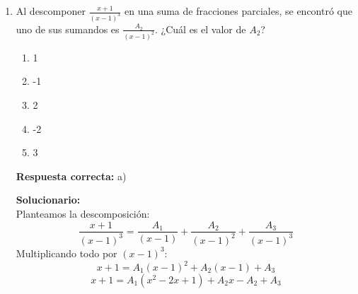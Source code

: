 \begin{enumerate}
	\begin{enumerate}[label=\alph*)]
		\item FVVV
		\item VFVV
		\item VVVF
		\item VVFF
		\item FFVF
	\end{enumerate}
	
	\textbf{Respuesta correcta:} a)
	
	\vspace{2mm}
	\textbf{Solucionario:}\\
	\begin{itemize}
		\item \textbf{I. (F)} Pues $(A + B)^2 = A^2 + AB + BA + B^2$. 
		\item \textbf{II. (V)} La suma de matrices es conmutativa, 
		\item \textbf{III. (V)} Propiedad de los determinantes: el determinante del producto es el producto de los determinantes.
		\item \textbf{IV. (V)} Propiedad de los determinantes: $|B^{-1}| = \displaystyle\frac{1}{|B|}$.
	\end{itemize}
	
	
	
	\vspace{6mm}
	
	
	\item Al descomponer $\displaystyle\frac{x+1}{(x-1)^3}$ en una suma de fracciones parciales, se encontró que uno de sus sumandos es $\displaystyle\frac{A_2}{(x-1)^2}$. ¿Cuál es el valor de $A_2$?
	
	\begin{enumerate}[label=\alph*)]
		\item 1
		\item -1
		\item 2
		\item -2
		\item 3
	\end{enumerate}
	
	\textbf{Respuesta correcta:} a)
	
	\vspace{2mm}
	\textbf{Solucionario:}\\
	Planteamos la descomposición:
	\[ \frac{x+1}{(x-1)^3} = \frac{A_1}{(x-1)} + \frac{A_2}{(x-1)^2} + \frac{A_3}{(x-1)^3} \]
	Multiplicando todo por $(x-1)^3$:
	\[ x + 1 = A_1(x-1)^2 + A_2(x-1) + A_3 \]
	\[ x + 1 = A_1(x^2 - 2x + 1) + A_2x - A_2 + A_3 \]
	

\end{enumerate}
